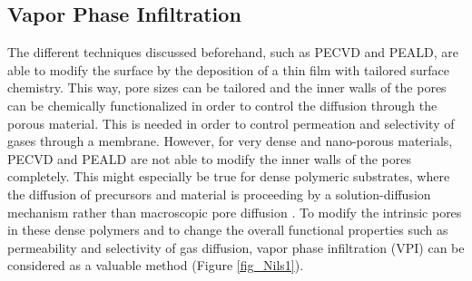 \documentclass[AMA,STIX2COL]{WileyNJD-v2} %
\begin{document}




\subsection{Vapor Phase Infiltration }\label{subsubsec43}


The different techniques discussed beforehand, such as PECVD and PEALD, are able to modify the surface by the deposition of a thin film with tailored surface chemistry. This way, pore sizes can be tailored and the inner walls of the pores can be chemically functionalized in order to control the diffusion through the porous material. This is needed in order to control permeation and selectivity of gases through a membrane. However, for very dense and nano-porous materials, PECVD and PEALD are not able to modify the inner walls of the pores completely. This might especially be true for dense polymeric substrates, where the diffusion of precursors and material is proceeding by a solution-diffusion mechanism rather than macroscopic pore diffusion \cite{Wijmans.1995}. To modify the intrinsic pores in these dense polymers and to change the overall functional properties such as permeability and selectivity of gas diffusion, vapor phase infiltration (VPI) can be considered as a valuable method (Figure \ref{fig_Nils1}). \cite{Leng.2017}
\end{document}
